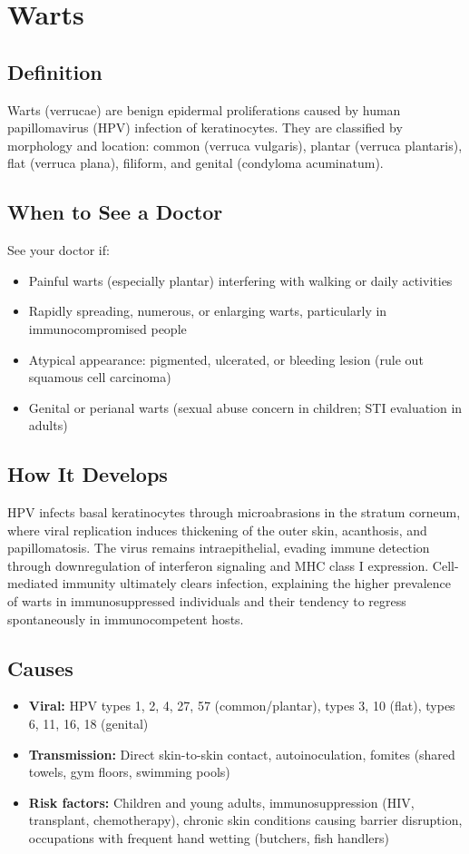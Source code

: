 \chapter{Warts}

\section*{Definition}
Warts (verrucae) are benign epidermal proliferations caused by human papillomavirus (HPV) infection of keratinocytes. They are classified by morphology and location: common (verruca vulgaris), plantar (verruca plantaris), flat (verruca plana), filiform, and genital (condyloma acuminatum).

\section*{When to See a Doctor}
See your doctor if:
\begin{itemize}
  \item Painful warts (especially plantar) interfering with walking or daily activities
  \item Rapidly spreading, numerous, or enlarging warts, particularly in immunocompromised people
  \item Atypical appearance: pigmented, ulcerated, or bleeding lesion (rule out squamous cell carcinoma)
  \item Genital or perianal warts (sexual abuse concern in children; STI evaluation in adults)
\end{itemize}

\section*{How It Develops}
HPV infects basal keratinocytes through microabrasions in the stratum corneum, where viral replication induces thickening of the outer skin, acanthosis, and papillomatosis. The virus remains intraepithelial, evading immune detection through downregulation of interferon signaling and MHC class I expression. Cell-mediated immunity ultimately clears infection, explaining the higher prevalence of warts in immunosuppressed individuals and their tendency to regress spontaneously in immunocompetent hosts.

\section*{Causes}
\begin{itemize}
  \item \textbf{Viral:} HPV types 1, 2, 4, 27, 57 (common/plantar), types 3, 10 (flat), types 6, 11, 16, 18 (genital)
  \item \textbf{Transmission:} Direct skin-to-skin contact, autoinoculation, fomites (shared towels, gym floors, swimming pools)
  \item \textbf{Risk factors:} Children and young adults, immunosuppression (HIV, transplant, chemotherapy), chronic skin conditions causing barrier disruption, occupations with frequent hand wetting (butchers, fish handlers)
\end{itemize}

